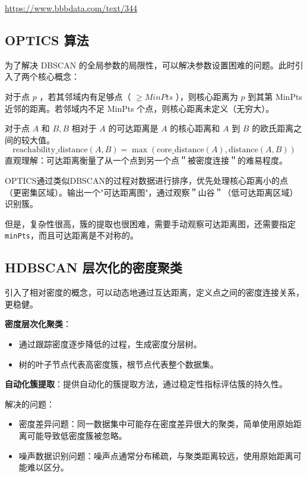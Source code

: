 \begin{tips}
    \href{https://www.bbbdata.com/text/344}{https://www.bbbdata.com/text/344}
\end{tips}

\subsection{OPTICS 算法}

为了解决 DBSCAN 的全局参数的局限性，可以解决参数设置困难的问题。此时引入了两个核心概念：

\begin{definition}[核心距离]
    对于点 $p$ ，若其邻域内有足够点（ $\geq M i n P t s$ ），则核心距离为 $p$ 到其第 MinPts 近邻的距离。若邻域内不足 MinPts 个点，则核心距离未定义（无穷大）。
\end{definition}

\begin{definition}[可达距离]
    对于点 $A$ 和 $B, B$ 相对于 $A$ 的可达距离是 $A$ 的核心距离和 $A$ 到 $B$ 的欧氏距离之间的较大值。
    $$
        \text{reachability\_distance}(A, B)=\max(\text{core\_distance}(A), \text{distance}(A, B))
    $$
    直观理解：可达距离衡量了从一个点到另一个点＂被密度连接＂的难易程度。
\end{definition}

OPTICS通过类似DBSCAN的过程对数据进行排序，优先处理核心距离小的点（更密集区域）。输出一个"可达距离图"，通过观察＂山谷＂（低可达距离区域）识别簇。

但是，复杂性很高，簇的提取也很困难，需要手动观察可达距离图，还需要指定 \verb`minPts`，而且可达距离是不对称的。

\subsection{HDBSCAN 层次化的密度聚类}

\begin{definition}[HDBSCAN]
    引入了相对密度的概念，可以动态地通过互达距离，定义点之间的密度连接关系，更稳健。

    \textbf{密度层次化聚类}：
    \begin{itemize}
        \item 通过跟踪密度逐步降低的过程，生成密度分层树。
        \item 树的叶子节点代表高密度簇，根节点代表整个数据集。
    \end{itemize}

    \textbf{自动化簇提取}：提供自动化的簇提取方法，通过稳定性指标评估簇的持久性。

    \begin{tips}
        解决的问题：
        \begin{itemize}
            \item 密度差异问题：同一数据集中可能存在密度差异很大的聚类，简单使用原始距离可能导致低密度簇被忽略。
            \item 噪声数据识别问题：噪声点通常分布稀疏，与聚类距离较远，使用原始距离可能难以区分。
        \end{itemize}
    \end{tips}
\end{definition}


